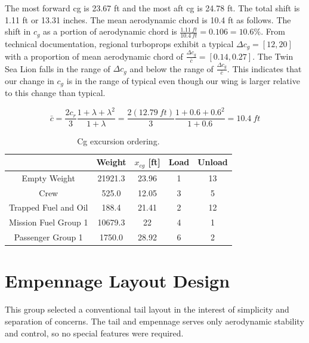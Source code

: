 \documentclass[conf]{new-aiaa}
\begin{document}
The most forward cg is 23.67 ft and the most aft cg is 24.78 ft. The total shift is 1.11 ft or 13.31 inches. The mean aerodynamic chord is 10.4 ft as follows\cite{aircraft dynamics}. The shift in $c_g$ as a portion of aerodynamic chord is $\frac{1.11\ ft}{10.4\ ft}=0.106=10.6\%$. From technical documentation, \cite{roskam 3} regional turboprops exhibit a typical $\Delta c_g=[12,20]$ with a proportion of mean aerodynamic chord of $\frac{\Delta c_g}{\bar{c}}=[0.14,0.27]$. The Twin Sea Lion falls in the range of $\Delta c_g$ and below the range of $\frac{\Delta c_g}{\bar{c}}$. This indicates that our change in $c_g$ is in the range of typical even though our wing is larger relative to this change than typical. 

\begin{equation*}
\bar{c}=\frac{2c_r}{3}\frac{1+\lambda+\lambda^2}{1+\lambda}=\frac{2(12.79\ ft)}{3}\frac{1+0.6+0.6^2}{1+0.6}=10.4\ ft
\end{equation*}



\begin{table}
\centering
\label{tab:Cg excursion ordering}
\caption{Cg excursion ordering.}
\begin{tabular}{|c|c|c|c|c|}\hline
			& Weight 	& $x_{cg}$ [ft] & Load & Unload \\ \hline
Empty Weight & 21921.3 & 23.96 & 1 & 13 \\ \hline
Crew & 525.0 & 12.05 & 3 & 5 \\ \hline
Trapped Fuel and Oil & 188.4 & 21.41 & 2 & 12 \\ \hline
Mission Fuel Group 1 & 10679.3 & 22 & 4 & 1 \\ \hline
Passenger Group 1 & 1750.0 & 28.92 & 6 & 2 \\ \hline

\end{tabular}
\end{table}

\section{Empennage Layout Design}

This group selected a conventional tail layout in the interest of simplicity and separation of concerns. The tail and empennage serves only aerodynamic stability and control, so no special features were required.
\end{document}
